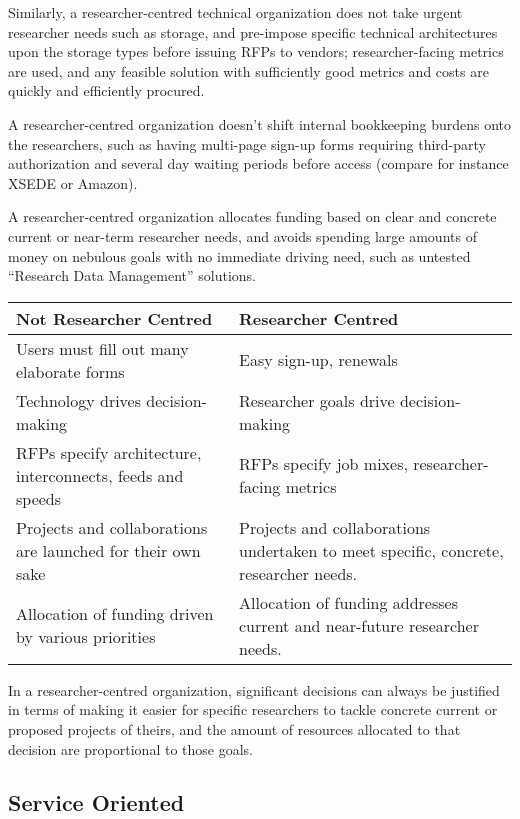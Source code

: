 \documentclass[11pt]{article}
\begin{document}
Similarly, a researcher-centred technical organization does not take urgent
researcher needs such as storage, and pre-impose specific technical
architectures upon the storage types before issuing RFPs to vendors;
researcher-facing metrics are used, and any feasible solution with
sufficiently good metrics and costs are quickly and efficiently 
procured.

A researcher-centred organization doesn't shift internal bookkeeping
burdens onto the researchers, such as having multi-page sign-up
forms requiring third-party authorization and several day waiting
periods before access (compare for instance XSEDE or Amazon).

A researcher-centred organization allocates funding based on clear
and concrete current or near-term researcher needs, and avoids 
spending large amounts of money on nebulous goals with no immediate
driving need, such as untested \enquote{Research Data Management} solutions.

\begin{table}[ht]
\centering
\small {\sffamily
{}
\begin{tabular}{p{2.5in}|p{2.5in}}
\textcolor{cdaRed}{\textbf{Not Researcher Centred}} & \textcolor{cdaRed}{\textbf{Researcher Centred}} \\
\hline
\hline
Users must fill out many elaborate forms & Easy sign-up, renewals \\
Technology drives decision-making & Researcher goals drive decision-making \\
RFPs specify architecture, interconnects, feeds and speeds & RFPs specify job mixes, researcher-facing metrics \\
Projects and collaborations are launched for their own sake & Projects and collaborations undertaken to meet specific, concrete, researcher needs.\\
Allocation of funding driven by various priorities & Allocation of funding addresses current and near-future researcher needs.\\
\hline
\end{tabular}
}
\end{table}

In a researcher-centred organization, significant decisions can
always be justified in terms of making it easier for specific
researchers to tackle concrete current or proposed projects of theirs,
and the amount of resources allocated to that decision are proportional
to those goals.

\subsection*{Service Oriented}
\end{document}
